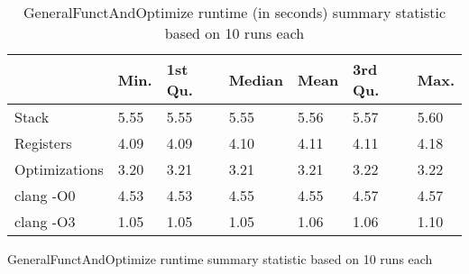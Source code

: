 \begin{table}[h!]
\centering
\begin{tabular}{p{}p{}p{}p{}p{}p{}p{}}
  \hline
 & Min. & 1st Qu. & Median & Mean & 3rd Qu. & Max. \\ 
  \hline
Stack & 5.55 & 5.55 & 5.55 & 5.56 & 5.57 & 5.60 \\ 
  Registers & 4.09 & 4.09 & 4.10 & 4.11 & 4.11 & 4.18 \\ 
  Optimizations & 3.20 & 3.21 & 3.21 & 3.21 & 3.22 & 3.22 \\ 
  clang -O0 & 4.53 & 4.53 & 4.55 & 4.55 & 4.57 & 4.57 \\ 
  clang -O3 & 1.05 & 1.05 & 1.05 & 1.06 & 1.06 & 1.10 \\ 
   \hline
\end{tabular}
\caption{GeneralFunctAndOptimize runtime summary statistic based on 10 runs each}
\caption{GeneralFunctAndOptimize runtime (in seconds) summary statistic based on 10 runs each}
\end{table}
